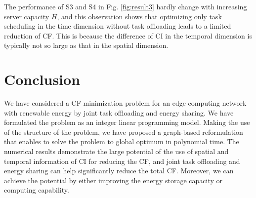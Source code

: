 \documentclass[conference, 10pt, ﬁnal, letterpaper, twocolumn]{IEEEtran}
\begin{document}
The performance of S3 and S4 in Fig. \ref{fig:result3} hardly change with increasing server capacity $H$, and this observation shows that optimizing only task scheduling in the time dimension without task offloading leads to a limited reduction of CF. This is because the difference of CI in the temporal dimension is typically not so large as that in the spatial dimension.

\section{Conclusion} \label{Sec:conclusion}
We have considered a CF minimization problem for an edge computing network with renewable energy by joint task offloading and energy sharing. We have formulated the problem as an integer linear programming model. Making the use of the structure of the problem, we have proposed a graph-based reformulation that enables to solve the problem to global optimum in polynomial time. The numerical results demonstrate the large potential of the use of spatial and temporal information of CI for reducing the CF, and joint task offloading and energy sharing can help significantly reduce the total CF. Moreover, we can achieve the potential by either improving the energy storage capacity or computing capability.



\end{document}
